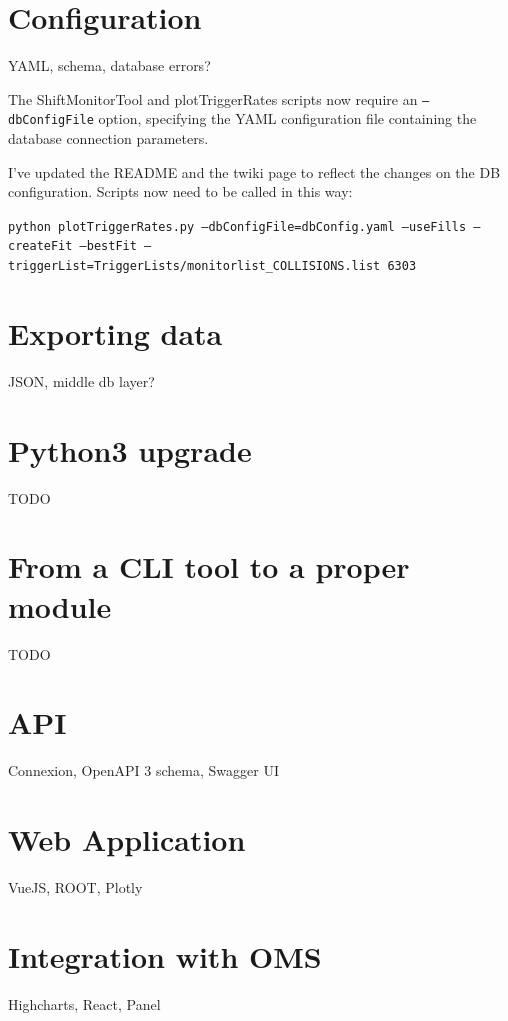 \section{Configuration}

YAML, schema, database errors?

The ShiftMonitorTool and plotTriggerRates scripts now require an \texttt{--dbConfigFile} option, specifying the YAML configuration file containing the database connection parameters.

I've updated the README and the twiki page to reflect the changes on the DB configuration. Scripts now need to be called in this way:

\texttt{python plotTriggerRates.py --dbConfigFile=dbConfig.yaml --useFills --createFit --bestFit --triggerList=TriggerLists/monitorlist\_COLLISIONS.list 6303}

\section{Exporting data}

JSON, middle db layer?

\section{Python3 upgrade}

TODO

\section{From a CLI tool to a proper module}

TODO

\section{API}

Connexion, OpenAPI 3 schema, Swagger UI

\section{Web Application}

VueJS, ROOT, Plotly

\section{Integration with OMS}

Highcharts, React, Panel


